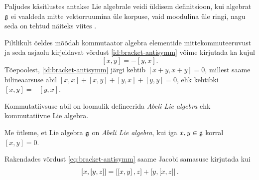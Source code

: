\begin{markus}
    Paljudes käsitlustes antakse Lie algebrale veidi üldisem definitsioon,
    kui algebrat $\mathfrak{g}$ ei vaaldeda mitte vektorruumina üle korpuse,
    vaid moodulina üle ringi, nagu seda on tehtud näiteks viites
    \cite{bourbaki1989lie}.
\end{markus}

Piltlikult öeldes mõõdab kommutaator
algebra elementide mittekommuteeruvust ja seda asjaolu kirjeldavat võrdust
\eqref{id:bracket-antisymm} võime kirjutada ka kujul
\begin{equation}\label{eq:bracket-antisymm}
    [x, y] = -[y, x].
\end{equation}
Tõepoolest, \eqref{id:bracket-antisymm} järgi kehtib $[x+y, x+y] = 0$,
millest saame bilineaarsuse abil $[x, x] + [x, y] + [y, x] + [y, y] = 0$,
ehk kehtibki $[x, y] = -[y, x]$.

Kommutatiivsuse abil on loomulik defineerida \emph{Abeli Lie algebra} ehk
kommutatiivne Lie algebra.
\begin{dfn}
    Me ütleme, et Lie algebra $\mathfrak{g}$ on \emph{Abeli Lie algebra}, kui iga
    $x, y \in \mathfrak{g}$ korral $[x, y] = 0$.
\end{dfn}

Rakendades võrdust \eqref{eq:bracket-antisymm} saame Jacobi samasuse
kirjutada kui
\begin{align}\label{id:jacobi-modified}
    \left[ x, \left[ y, z \right] \right] = \left[ \left[ x, y \right], z \right] + \left[ y, \left[ x, z \right] \right].
\end{align}

